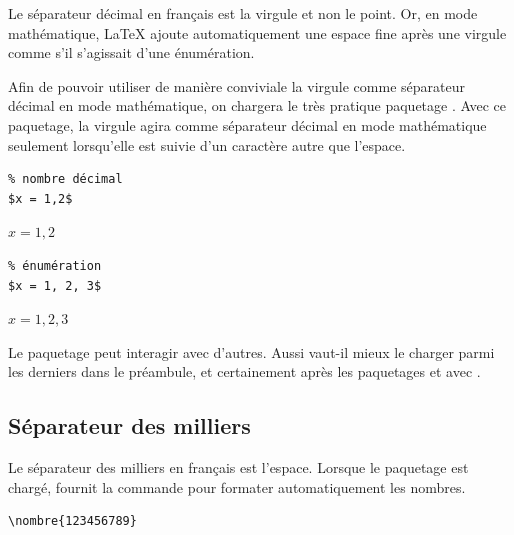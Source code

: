 {Le séparateur décimal en français est la virgule et non le point. Or,
en mode mathématique, LaTeX ajoute automatiquement une espace fine
après une virgule comme s'il s'agissait d'une énumération.

Afin de pouvoir utiliser de manière conviviale la virgule comme
séparateur décimal en mode mathématique, on chargera le très pratique
paquetage  \citep{icomma}. Avec ce paquetage, la virgule
agira comme séparateur décimal en mode mathématique seulement
lorsqu'elle est suivie d'un caractère autre que l'espace.
\begin{demo}
  \begin{minipage}{0.5\linewidth}
    \begin{texample}[0.6\linewidth]
\begin{lstlisting}
% nombre décimal
$x = 1,2$
\end{lstlisting}
      \producing
      $x = 1,2$
    \end{texample}
  \end{minipage}
  \hfill
  \begin{minipage}{0.5\linewidth}
    \begin{texample}[0.6\linewidth]
\begin{lstlisting}
% énumération
$x = 1, 2, 3$
\end{lstlisting}
      \producing
      $x = 1, 2, 3$
    \end{texample}
  \end{minipage}
\end{demo}

\begin{important}
  Le paquetage  peut interagir avec d'autres. Aussi
  vaut-il mieux le charger parmi les derniers dans le préambule, et
  certainement après les paquetages  et
   avec {\XeLaTeX}.
\end{important}

\subsection{Séparateur des milliers}
\label{sec:bases:francais:milliers}

Le séparateur des milliers en français est l'espace. Lorsque le
paquetage  \citep{numprint} est chargé, 
fournit la commande \cmd{\nombre} pour formater automatiquement les
nombres.
\begin{demo}
  \begin{texample}
\begin{lstlisting}
\nombre{123456789}
\end{lstlisting}
    \producing
  \end{texample}
\end{demo}

}
